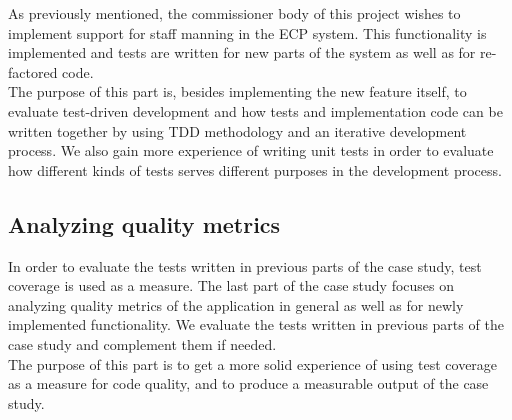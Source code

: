 As previously mentioned, the commissioner body of this project wishes to
implement support for staff manning in the ECP system. This
functionality is implemented and tests are written for new parts of the
system as well as for re-factored code.\\

The purpose of this part is, besides implementing the new feature
itself, to evaluate test-driven development and how tests and
implementation code can be written together by using TDD methodology and
an iterative development process. We also gain more experience of
writing unit tests in order to evaluate how different kinds of tests
serves different purposes in the development process.\\


\subsection{Analyzing quality metrics}
\label{sec:casestudy_3}

In order to evaluate the tests written in previous parts of the case
study, test coverage is used as a measure. The last part of the case
study focuses on analyzing quality metrics of the application in general
as well as for newly implemented functionality. We evaluate the tests
written in previous parts of the case study and complement them if
needed.\\

The purpose of this part is to get a more solid experience of using test
coverage as a measure for code quality, and to produce a measurable
output of the case study.\\
